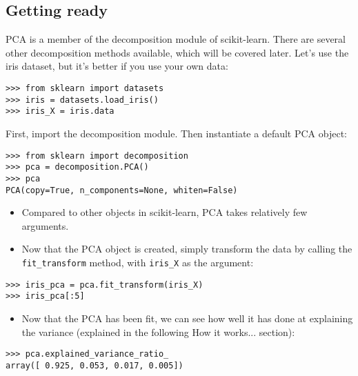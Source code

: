 \documentclass[SKL-MASTER.tex]{subfiles}
\begin{document}
\subsection*{Getting ready}
PCA is a member of the decomposition module of scikit-learn. There are several other
decomposition methods available, which will be covered later.
Let's use the iris dataset, but it's better if you use your own data:
\begin{framed}
\begin{verbatim}
>>> from sklearn import datasets
>>> iris = datasets.load_iris()
>>> iris_X = iris.data
\end{verbatim}
\end{framed}
First, import the decomposition module. Then instantiate a default PCA object:
\begin{framed}
	\begin{verbatim}
>>> from sklearn import decomposition
>>> pca = decomposition.PCA()
>>> pca
PCA(copy=True, n_components=None, whiten=False)
\end{verbatim}
\end{framed}


\begin{itemize}
\item Compared to other objects in scikit-learn, PCA takes relatively few arguments. 
\item Now that the
PCA object is created, simply transform the data by calling the \texttt{fit\_transform} method,
with \texttt{iris\_X} as the argument:
\end{itemize}
{
\large
\begin{framed}
	\begin{verbatim}
>>> iris_pca = pca.fit_transform(iris_X)
>>> iris_pca[:5]
\end{verbatim}
\end{framed}
}
\begin{itemize}
\item Now that the PCA has been fit, we can see how well it has done at explaining the variance
(explained in the following How it works... section):
\end{itemize}

\begin{verbatim}
>>> pca.explained_variance_ratio_
array([ 0.925, 0.053, 0.017, 0.005])
\end{verbatim}
\end{document}
